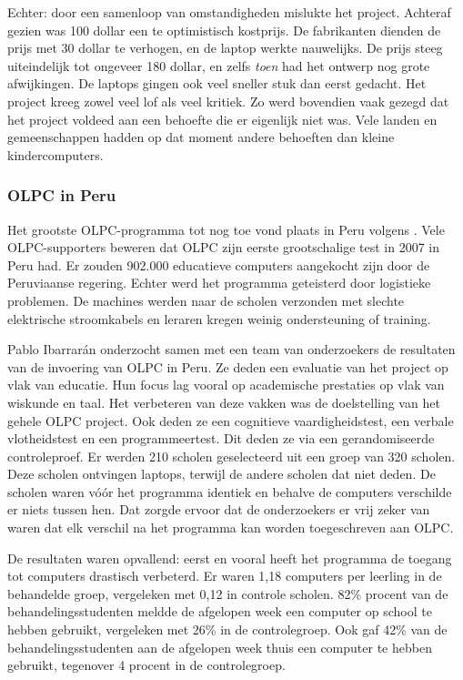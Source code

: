 Echter: door een samenloop van omstandigheden mislukte het project. Achteraf gezien was 100 dollar een te optimistisch kostprijs. De fabrikanten dienden de prijs met 30 dollar te verhogen, en de laptop werkte nauwelijks. De prijs steeg uiteindelijk tot ongeveer 180 dollar, en zelfs \textit{toen} had het ontwerp nog grote afwijkingen. De laptops gingen ook veel sneller stuk dan eerst gedacht. Het project kreeg zowel veel lof als veel kritiek. Zo werd bovendien vaak gezegd dat het project voldeed aan een behoefte die er eigenlijk niet was. Vele landen en gemeenschappen hadden op dat moment andere behoeften dan kleine kindercomputers. \autocite{Robertson2018}

\subsubsection{OLPC in Peru}
\label{olpc-in-peru}
Het grootste OLPC-programma tot nog toe vond plaats in Peru volgens \autocite{Trucano2012}. Vele OLPC-supporters beweren dat OLPC zijn eerste grootschalige test in 2007 in Peru had. Er zouden 902.000 educatieve computers aangekocht zijn door de Peruviaanse regering. Echter werd het programma geteisterd door logistieke problemen. De machines werden naar de scholen verzonden met slechte elektrische stroomkabels en leraren kregen weinig ondersteuning of training. \autocite{Robertson2018}

Pablo Ibarrarán onderzocht samen met een team van onderzoekers de resultaten van de invoering van OLPC in Peru. \autocite{Ibarraran2012} Ze deden een evaluatie van het project op vlak van educatie. Hun focus lag vooral op academische prestaties op vlak van wiskunde en taal. Het verbeteren van deze vakken was de doelstelling van het gehele OLPC project. Ook deden ze een cognitieve vaardigheidstest, een verbale vlotheidstest en een programmeertest. Dit deden ze via een gerandomiseerde controleproef. Er werden 210 scholen geselecteerd uit een groep van 320 scholen. Deze scholen ontvingen laptops, terwijl de andere scholen dat niet deden. De scholen waren vóór het programma identiek en behalve de computers verschilde er niets tussen hen. Dat zorgde ervoor dat de onderzoekers er vrij zeker van waren dat elk verschil na het programma kan worden toegeschreven aan OLPC. \autocite{Ibarraran2012}

De resultaten waren opvallend: eerst en vooral heeft het programma de toegang tot computers drastisch verbeterd. Er waren 1,18 computers per leerling in de behandelde groep, vergeleken met 0,12 in controle scholen. 82\% procent van de behandelingsstudenten meldde de afgelopen week een computer op school te hebben gebruikt, vergeleken met 26\% in de controlegroep. Ook gaf 42\% van de behandelingsstudenten aan de afgelopen week thuis een computer te hebben gebruikt, tegenover 4 procent in de controlegroep. \autocite{Ibarraran2012}

